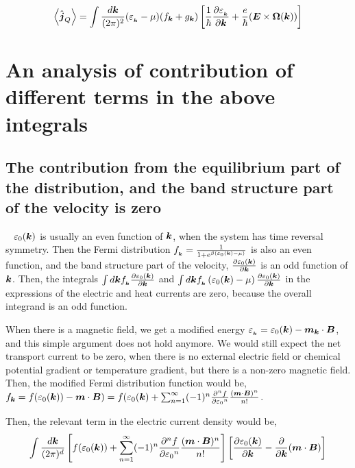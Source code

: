 \documentclass{report}
\renewcommand\vec[1]{\ensuremath\boldsymbol{#1}} %
\begin{document}
\begin{equation} \label{Eq:heat-current-simplified}
	\expval{\hat{\vec{j}}_Q} = \int \frac{d\vec{k}}{(2\pi)^2} (\varepsilon_{_{\vec{k}}} - \mu) ({f}_{\vec{k}} + {g}_{\vec{k}}) \left[\frac{1}{\hbar} \frac{\partial \varepsilon_{_{\vec{k}}}}{\partial \vec{k}} + \frac{e}{\hbar} (\vec{E}\times\vec{\Omega}(\vec{k}))\right]
\end{equation}

\section{An analysis of contribution of different terms in the above integrals}
\subsection{The contribution from the equilibrium part of the distribution, and the band structure part of the velocity is \textbf{zero}}~\label{sec:zeroCont}
$\varepsilon_0 (\vec{k})$ is usually an even function of $\vec{k}$, when the system has time reversal symmetry. Then the Fermi distribution $f_{_{\vec{k}}} = \frac{1}{1+ e^{\beta\left(\varepsilon_0 (\vec{k}) - \mu\right)}}$ is also an even function, and the band structure part of the velocity, $\frac{\partial \varepsilon_0 (\vec{k})}{\partial \vec{k}}$ is an odd function of $\vec{k}$. Then, the integrals $\int d\vec{k} f_{_{\vec{k}}} \frac{\partial \varepsilon_0 (\vec{k})}{\partial \vec{k}}$ and $\int d\vec{k} f_{_{\vec{k}}} \left(\varepsilon_0 (\vec{k}) - \mu\right) \frac{\partial \varepsilon_0 (\vec{k})}{\partial \vec{k}}$ in the expressions of the electric and heat currents are zero, because the overall integrand is an odd function.

When there is a magnetic field, we get a modified energy $\varepsilon_{_{\vec{k}}} = \varepsilon_0 (\vec{k}) - \vec{m}_{\vec{k}} \cdot \vec{B}$, and this simple argument does not hold anymore. We would still expect the net transport current to be zero, when there is no external electric field or chemical potential gradient or temperature gradient, but there is a non-zero magnetic field.
Then, the modified Fermi distribution function would be,
$f_{\vec{k}} = f(\varepsilon_0(\vec{k})) - \vec{m}\cdot\vec{B}) = f(\varepsilon_0(\vec{k}) + \sum_{n=1}^{\infty} (-1)^n \frac{\partial^n f}{\partial {\varepsilon_0}^n} \frac{(\vec{m}\cdot \vec{B})^n}{n!}$.

Then, the relevant term in the electric current density would be,
$$
\int \frac{d\vec{k}}{(2\pi)^d} \left[f(\varepsilon_0(\vec{k})) + \sum_{n=1}^{\infty} (-1)^n \frac{\partial^n f}{\partial {\varepsilon_0}^n} \frac{(\vec{m}\cdot \vec{B})^n}{n!}\right] \left[\frac{\partial \varepsilon_0 (\vec{k})}{\partial \vec{k}} - \frac{\partial }{\partial \vec{k}}(\vec{m}\cdot\vec{B}) \right]
$$
\end{document}
